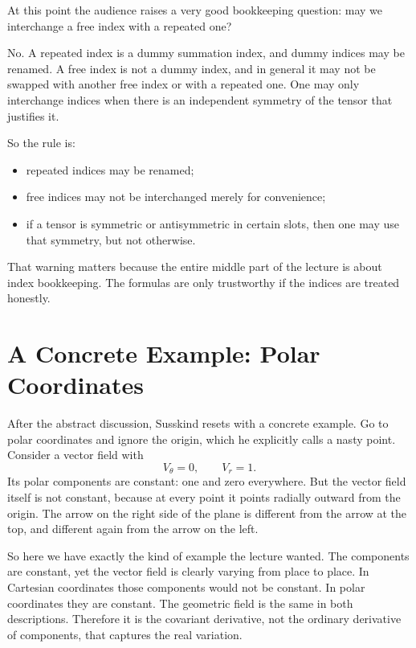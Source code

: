 At this point the audience raises a very good bookkeeping question: may we interchange a free index with a repeated one?

No. A repeated index is a dummy summation index, and dummy indices may be renamed. A free index is not a dummy index, and in general it may not be swapped with another free index or with a repeated one. One may only interchange indices when there is an independent symmetry of the tensor that justifies it.

So the rule is:
\begin{itemize}
\item repeated indices may be renamed;
\item free indices may not be interchanged merely for convenience;
\item if a tensor is symmetric or antisymmetric in certain slots, then one may use that symmetry, but not otherwise.
\end{itemize}

That warning matters because the entire middle part of the lecture is about index bookkeeping. The formulas are only trustworthy if the indices are treated honestly.

\section{A Concrete Example: Polar Coordinates}

After the abstract discussion, Susskind resets with a concrete example. Go to polar coordinates and ignore the origin, which he explicitly calls a nasty point. Consider a vector field with
\begin{equation}
V_\theta=0,
\qquad
V_r=1.
\end{equation}
Its polar components are constant: one and zero everywhere. But the vector field itself is not constant, because at every point it points radially outward from the origin. The arrow on the right side of the plane is different from the arrow at the top, and different again from the arrow on the left.

So here we have exactly the kind of example the lecture wanted. The components are constant, yet the vector field is clearly varying from place to place. In Cartesian coordinates those components would not be constant. In polar coordinates they are constant. The geometric field is the same in both descriptions. Therefore it is the covariant derivative, not the ordinary derivative of components, that captures the real variation.

